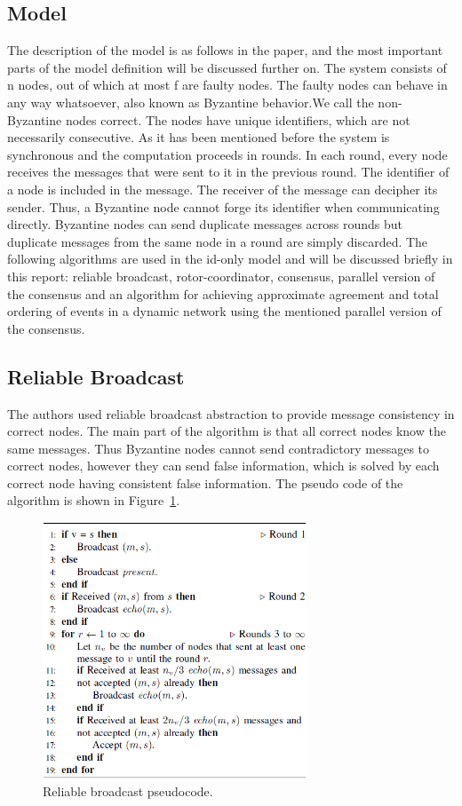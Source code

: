 \documentclass{article}
\begin{document}
\subsection{Model}
The description of the model is as follows in the paper, and the most important parts of the model definition will be discussed further on. The system consists of n nodes, out of which at most f are faulty nodes. The faulty nodes can behave in any way whatsoever, also known as Byzantine behavior.We call the non-Byzantine nodes correct. The nodes have unique identifiers, which are not necessarily consecutive. As it has been mentioned before the system is synchronous and the computation proceeds in rounds. In each round, every node receives the messages that were sent to it in the previous round. The identifier of a node is included in the message. The receiver of the message can decipher its sender. Thus, a Byzantine node cannot forge its identifier when communicating directly. Byzantine nodes can send duplicate messages across rounds but duplicate messages from the same node in a round are simply discarded. The following algorithms are used in the id-only model and will be discussed briefly in this report: reliable broadcast, rotor-coordinator, consensus, parallel version of the consensus and an algorithm for achieving approximate agreement and total ordering of events in a dynamic network using the mentioned parallel version of the consensus.

\subsection{Reliable Broadcast}
The authors used reliable broadcast\cite{srikanth1987simulating} abstraction to provide message consistency in correct nodes. The main part of the algorithm is that all correct nodes know the same messages. Thus Byzantine nodes cannot send contradictory messages to correct nodes,  however they can send false information, which is solved by each correct node having consistent false information. The pseudo code of the algorithm is shown in Figure~\ref{reliable_fig}.

\begin{figure}[hbt!]
    \centering
    \includegraphics[width=0.70\textwidth]{figures/reliable_broadcast.png}
    \caption{Reliable broadcast pseudocode.\label{reliable_fig}}
\end{figure}
\end{document}
